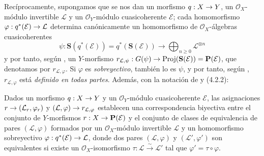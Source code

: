 \documentclass[oneside,10pt]{amsart}
\makeatletter
\renewcommand{\geq}{\geqslant}
\newcommand{\ega@arrow}[2]{\mathchoice{#1}{#2}{#2}{#2}}
\renewcommand{\to}{\ega@arrow{\longrightarrow}{\rightarrow}}
\let\EGAOriginalLabel\label
\renewcommand{\label}[1]{\phantomsection\EGAOriginalLabel{#1}}
\makeatother
\begin{document}
\begin{env}[4.2.2]
\label{II.4.2.2-fr}
Recíprocamente, supongamos que se nos dan un morfismo $q:X\to Y$, un $\mathcal{O}_X$-módulo invertible $\mathcal{L}$ y un $\mathcal{O}_Y$-módulo cuasicoherente $\mathcal{E}$;
cada homomorfismo $\varphi:q^*(\mathcal{E})\to\mathcal{L}$ determina canónicamente un homomorfismo de $\mathcal{O}_X$-álgebras cuasicoherentes
\[
  \psi:\mathbf{S}(q^*(\mathcal{E}))=q^*(\mathbf{S}(\mathcal{E}))
  \longrightarrow\bigoplus_{n\geq0}\mathcal{L}^{\otimes n}
\]
y por tanto, según , un $Y$-morfismo $r_{\mathcal{L},\psi}:G(\psi)\to
\operatorname{Proj}(\mathbf{S}(\mathcal{E}))=\mathbf{P}(\mathcal{E})$, que denotamos por $r_{\mathcal{L},\varphi}$.
Si $\varphi$ es \emph{sobreyectivo}, también lo es $\psi$, y por tanto, según , $r_{\mathcal{L},\varphi}$ está \emph{definido en todas partes}.
Además, con la notación de  y (4.2.2):
\end{env}

\begin{proposition}[4.2.3]
\label{II.4.2.3-fr}
Dados un morfismo $q:X\to Y$ y un $\mathcal{O}_Y$-módulo cuasicoherente $\mathcal{E}$, las asignaciones $r\to(\mathcal{L}_r,\varphi_r)$ y $(\mathcal{L},\varphi)\to r_{\mathcal{L},\varphi}$ establecen una correspondencia biyectiva entre el conjunto de $Y$-morfismos $r:X\to\mathbf{P}(\mathcal{E})$ y el conjunto de clases de equivalencia de pares $(\mathcal{L},\varphi)$ formados por un $\mathcal{O}_X$-módulo invertible $\mathcal{L}$ y un homomorfismo sobreyectivo $\varphi:q^*(\mathcal{E})\to\mathcal{L}$, donde dos pares $(\mathcal{L},\varphi)$ y $(\mathcal{L}',\varphi')$ son equivalentes si existe un $\mathcal{O}_X$-isomorfismo $\tau:\mathcal{L}\xrightarrow{\sim}\mathcal{L}'$ tal que $\varphi'=\tau\circ\varphi$.
\end{proposition}
\end{document}
